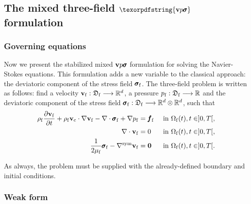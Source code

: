 \documentclass[11pt,english]{article}
\def\alevelocity{\vb{v}_{\mathrm{c}}}
\def\densfluid{\rho_{\rm{f}}}                %
\def\viscfluid{\mu_{\rm{f}}}                 %
\def\domainfluid{\Omega_{\rm{f}}}
\def\vfluid{\vb{v}_{\rm{f}}}               %
\def\pfluid{p_{\mathrm{f}}}                %
\def\bodyffluid{\pmb{f}_{\rm{f}}}          %
\def\sigmafluid{\pmb{\sigma}_{\rm{f}}}
\def\vpsigma{\vb{v}p\pmb{\sigma}}
\begin{document}
%
%

\subsection{The mixed three-field $\texorpdfstring{\vpsigma}~$ formulation\label{subsec:vpsigma_formulation}}

\subsubsection{Governing equations}

Now we present the stabilized mixed $\vpsigma$ formulation for solving the Navier-Stokes equations. This formulation adds a new variable to the classical approach: the deviatoric component of the  stress field $\sigmafluid$. The three-field problem is written as follows: find a velocity $\vfluid:\mathfrak{D}_{\rm{f}}\longrightarrow {\mathbb R}^d$, a pressure $\pfluid:\mathfrak{D}_{\rm{f}}\longrightarrow {\mathbb R}$ and the deviatoric component of the stress field $\sigmafluid:\mathfrak{D}_{\rm{f}} \longrightarrow \mathbb{R}^{d}\otimes\mathbb{R}^{d}$, such that
\begin{align}
    \densfluid\frac{\partial \vfluid}{\partial t} + \densfluid \alevelocity \cdot \nabla \vfluid-\nabla\cdot\sigmafluid+\nabla \pfluid&=\bodyffluid  && \text{ in } \domainfluid(t),t\in]0,T[,\label{eq:sigmaup_momentum_equation_vps}\\
    \nabla\cdot\vfluid&=0  && \text{ in }\domainfluid(t),  t\in]0,T[,\label{eq:sigmaup_incompressibility_equation_vps}\\
    \frac{1}{2\viscfluid}\sigmafluid-\nabla^{\rm sym}\vfluid
    &=\textbf{0} && \text{ in }\domainfluid(t), t\in]0,T[.\label{eq:sigmaup_constitutive_equation_vps} %
\end{align}

As always, the problem must be supplied with the already-defined boundary and initial conditions.

\subsubsection{Weak form}
\end{document}
